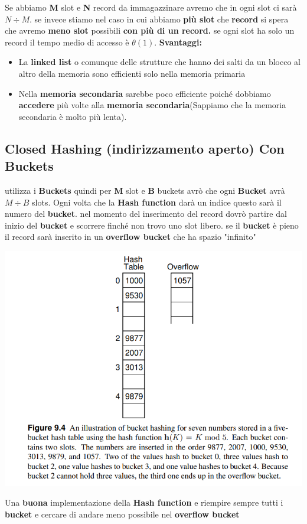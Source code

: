 \newpage
Se abbiamo \textbf{M} slot e \textbf{N} record da immagazzinare avremo che in ogni slot ci sarà $N \div M$. se invece stiamo nel caso in cui abbiamo \textbf{più slot} che \textbf{record} si spera che avremo \textbf{meno slot} possibili \textbf{con più di un record.} \newline
se ogni slot ha solo un record il tempo medio di accesso è $\theta(1)$.\newline\newline
\textbf{Svantaggi:}
\begin{itemize}
    \item La \textbf{linked list} o comunque delle strutture che hanno dei salti da un blocco al altro della memoria sono efficienti solo nella memoria primaria
    \item Nella \textbf{memoria secondaria} sarebbe poco efficiente poiché dobbiamo \textbf{accedere} più volte alla \textbf{memoria secondaria}(Sappiamo che la memoria secondaria è molto più lenta).
\end{itemize}
\subsection{Closed Hashing (indirizzamento aperto) Con Buckets}
\textbf{\textcolor{blue}{}} utilizza i \textbf{Buckets} quindi per\textbf{ M} slot e \textbf{B} buckets avrò che ogni \textbf{Bucket} avrà $M \div B$ slots. \newline
Ogni volta che la \textbf{Hash function} darà un indice questo sarà il numero del \textbf{bucket}. nel momento del inserimento del record dovrò partire dal inizio del \textbf{bucket} e scorrere finché non trovo uno slot libero. se il \textbf{bucket} è pieno il record sarà inserito in un \textbf{overflow bucket} che ha spazio "infinito"
\begin{center}
    \includegraphics[scale = 0.6]{Capitoli/HashTable/Esempi/ClosingHash.png}
\end{center}
Una \textbf{buona} implementazione della \textbf{Hash function} e riempire sempre tutti i \textbf{bucket} e cercare di andare meno possibile nel \textbf{overflow bucket}

